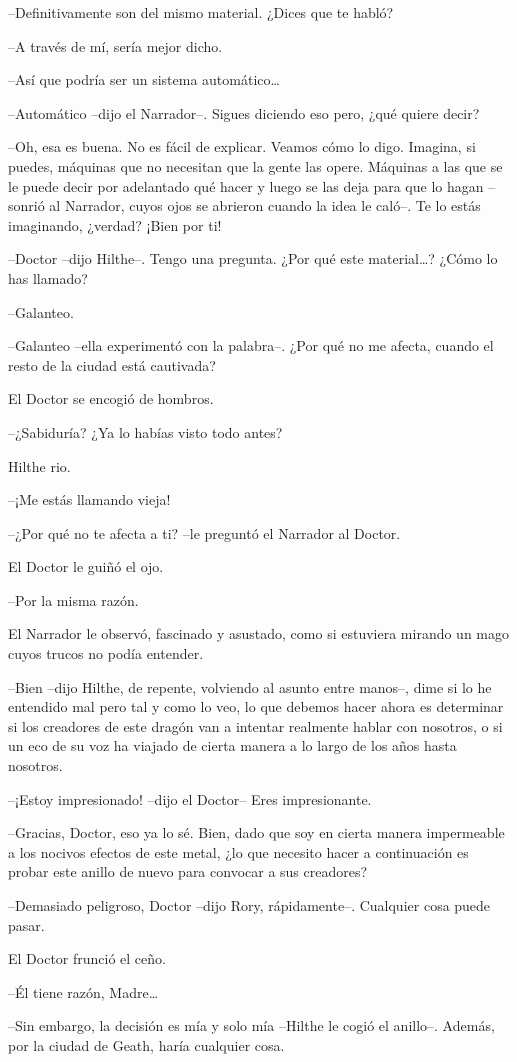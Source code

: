 {--Definitivamente son del mismo material. ¿Dices que te habló?}

{--A través de mí, sería mejor dicho.}

{--Así que podría ser un sistema automático\ldots{}}

{--Automático --dijo el Narrador--. Sigues diciendo eso pero, ¿qué
quiere decir?}

{--Oh, esa es buena. No es fácil de explicar. Veamos cómo lo digo.
	Imagina, si puedes, máquinas que no necesitan que la gente las opere.
	Máquinas a las que se le puede decir por adelantado qué hacer y luego se
	las deja para que lo hagan --sonrió al Narrador, cuyos ojos se abrieron
	cuando la idea le caló--. Te lo estás imaginando, ¿verdad? ¡Bien por
ti!}

{--Doctor --dijo Hilthe--. Tengo una pregunta. ¿Por qué este
	material\ldots{}? ¿Cómo lo has llamado?}

{--Galanteo.}

{--Galanteo --ella experimentó con la palabra--. ¿Por qué no me
afecta, cuando el resto de la ciudad está cautivada?}

{El Doctor se encogió de hombros.}

{--¿Sabiduría? ¿Ya lo habías visto todo antes?}

{Hilthe rio.}

{--¡Me estás llamando vieja!}

{--¿Por qué no te afecta a ti? --le preguntó el Narrador al Doctor.}

{El Doctor le guiñó el ojo.}

{--Por la misma razón.}

{El Narrador le observó, fascinado y asustado, como si estuviera mirando
un mago cuyos trucos no podía entender.}

{--Bien --dijo Hilthe, de repente, volviendo al asunto entre manos--,
	dime si lo he entendido mal pero tal y como lo veo, lo que debemos hacer
	ahora es determinar si los creadores de este dragón van a intentar
	realmente hablar con nosotros, o si un eco de su voz ha viajado de
cierta manera a lo largo de los años hasta nosotros.}

{--¡Estoy impresionado! --dijo el Doctor-- Eres impresionante.}

{--Gracias, Doctor, eso ya lo sé. Bien, dado que soy en cierta manera
	impermeable a los nocivos efectos de este metal, ¿lo que necesito hacer
	a continuación es probar este anillo de nuevo para convocar a sus
creadores?}

{--Demasiado peligroso, Doctor --dijo Rory, rápidamente--. Cualquier
cosa puede pasar.}

{El Doctor frunció el ceño.}

{--Él tiene razón, Madre\ldots{}}

{--Sin embargo, la decisión es mía y solo mía --Hilthe le cogió el
anillo--. Además, por la ciudad de Geath, haría cualquier cosa. }
